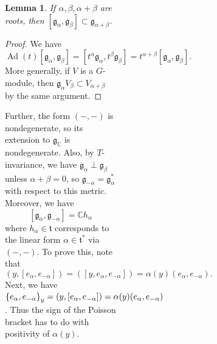 \documentclass[leqno, openany]{memoir}
\newtheorem{lem}[thm]{Lemma}
\theoremstyle{definition}
\theoremstyle{remark}
\theoremstyle{plain}
\theoremstyle{definition}
\theoremstyle{remark}
\newcommand{\C}{\mathbb{C}}
\newcommand{\mf}[1]{\mathfrak{#1}}
\DeclareMathOperator{\Ad}{Ad}
\begin{document}
\begin{figure}[H]
\begin{figure}[H]
\begin{figure}[H]
\begin{figure}[H]
\begin{lem} If $\alpha, \beta, \alpha + \beta$ are roots, then
$[\mf{g}_{\alpha}, \mf{g}_{\beta}] \subset \mf{g}_{\alpha + \beta}$.  \end{lem}

\begin{proof} We have \[ \Ad(t) [\mf{g}_{\alpha}, \mf{g}_{\beta}] = [t^{\alpha
}\mf{g}_{\alpha}, t^{\beta} \mf{g}_{\beta}] = t^{\alpha + \beta}
[\mf{g}_{\alpha}, \mf{g}_{\beta}]. \] More generally, if $V$ is a $G$-module,
then $\mf{g}_{\alpha} V_{\beta} \subset V_{\alpha + \beta}$ by the same
argument.  \end{proof}

Further, the form $(-,-)$ is nondegenerate, so its extension to $\mf{g}_{\C}$
is nondegenerate. Also, by $T$-invariance, we have $\mf{g}_{\alpha} \perp
\mf{g}_{\beta}$ unless $\alpha + \beta = 0$, so $\mf{g}_{-\alpha} =
\mf{g}_{\alpha}^*$ with respect to this metric. Moreover, we have \[
[\mf{g}_{\alpha}, \mf{g}_{-\alpha}] = \C h_{\alpha} \] where $h_{\alpha} \in
\mf{t}$ corresponds to the linear form $\alpha \in \mf{t}^*$ via $(-,-)$. To
prove this, note that \[ (y, [e_{\alpha}, e_{-\alpha}]) = ([y, e_{\alpha},
e_{-\alpha}]) = \alpha(y) (e_{\alpha}, e_{-\alpha}). \] Next, we have
$\qty{e_{\alpha}, e_{-\alpha}}_y = (y, [e_{\alpha}, e_{-\alpha}]) = \alpha(y)
(e_{\alpha}, e_{-\alpha})$. Thus the sign of the Poisson bracket has to do with
positivity of $\alpha(y)$.


\end{figure}
\end{figure}
\end{figure}
\end{figure}
\end{document}
